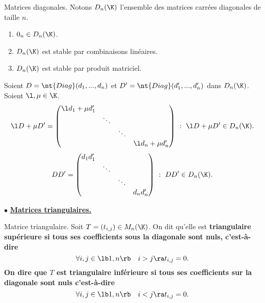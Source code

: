 \documentclass[11pt]{article}
\begin{document}
\begin{prop}{Matrices diagonales.}{}
    Notons $D_n(\K)$ l'ensemble des matrices carrées diagonales de taille $n$.
    \begin{enumerate}
        \item $0_n\in D_n(\K)$.
        \item $D_n(\K)$ est stable par combinaisons linéaires.
        \item $D_n(\K)$ est stable par produit matriciel.
    \end{enumerate}
    \tcblower
    Soient $D=\nt{Diag}(d_1,...,d_n)$ et $D'=\nt{Diag}(d_1',...,d_n')$ dans $D_n(\K)$. Soient $\l,\mu\in\K$.
    \begin{equation*}
        \l D + \mu D' = \begin{pmatrix}
            \l d_1 + \mu d_1'&&&\\
            & \ddots&&\\
            &&\ddots&\\
            &&&\l d_n + \mu d_n' 
        \end{pmatrix} ~:~ \l D + \mu D'\in D_n(\K).
    \end{equation*}
    \begin{equation*}
        DD'=\begin{pmatrix}
            d_1d_1' &&&\\
            &\ddots&&\\
            &&\ddots&\\
            &&& d_nd_n'
        \end{pmatrix} ~:~ DD'\in D_n(\K).
    \end{equation*}
\end{prop}

$\bullet$ \underline{\bf{Matrices triangulaires.}}

\begin{defi}{Matrice triangulaire.}{}
    Soit $T=(t_{i,j})\in M_n(\K)$. On dit qu'elle est \bf{triangulaire supérieure} si tous ses coefficients sous la diagonale sont nuls, c'est-à-dire
    \begin{equation*}
        \forall i,j \in \lb1,n\rb \quad i > j \ra t_{i,j}=0.
    \end{equation*}
    On dire que $T$ est \bf{triangulaire inférieure} si tous ses coefficients sur la diagonale sont nuls c'est-à-dire
    \begin{equation*}
        \forall i,j \in \lb1,n\rb \quad i < j \ra t_{i,j} = 0.
    \end{equation*}
\end{defi}
\end{document}
